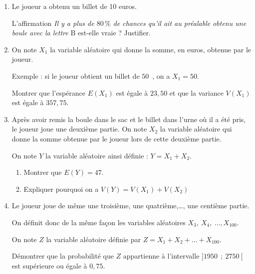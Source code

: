 \documentclass[10pt]{article}
\providecommand{\euro}{\texteuro}
\providecommand{\np}[2][]{{#2~#1}}
\providecommand{\euro}{{\text{€}}}
\renewcommand{\euro}{\ifmmode\text{\texteuro}\else\texteuro\fi}
\begin{document}
\begin{enumerate}[start=4]
\item Le joueur a obtenu un billet de 10 euros.

L'affirmation \og \emph{Il y a plus de $80\,\%$ de chances qu'il ait au préalable obtenu une boule avec la lettre} B \fg{} est-elle vraie ? Justifier.
\item On note $X_1$ la variable aléatoire qui donne la somme, en euros, obtenue par le joueur.

Exemple : si le joueur obtient un billet de $50$~\euro, on a $X_1 = 50$.

Montrer que l'espérance $E(X_1)$ est égale à $23,50$ et que la variance $V(X_1)$ est égale à $357,75$.
\item Après avoir remis la boule dans le sac et le billet dans l'urne où il a été pris, le joueur joue une deuxième partie. On note $X_2 $ la variable aléatoire qui donne la somme obtenue par le joueur lors de cette deuxième partie.

On note $Y$ la variable aléatoire ainsi définie : $Y = X_1 + X_2$.
	\begin{enumerate}
		\item Montrer que $E(Y) = 47$.
		\item Expliquer pourquoi on a $V(Y) = V(X_1) + V(X_2)$
	\end{enumerate}
\item Le joueur joue de même une troisième, une quatrième,\ldots, une centième partie.

On définit donc de la même façon les variables aléatoires $X_3, \:X_4,\:\ldots, X_{100}$.

On note $Z$ la variable aléatoire définie par $Z = X_1 + X_2 + \ldots + X_{100}$.

Démontrer que la probabilité que $Z$ appartienne à l'intervalle $]\np{1950}~;~\np{2750}[$ 
 est supérieure ou égale à $0,75$.
\end{enumerate}

\noindent

\bigskip
\end{document}
